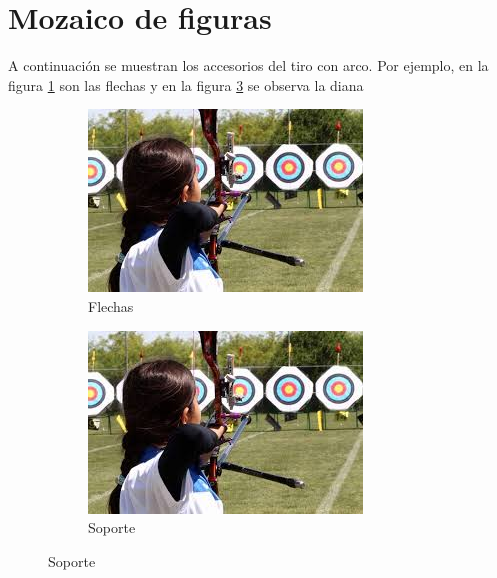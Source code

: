 \documentclass[12pt, legalpaper, twocolumn]{article}
\begin{document}
\section{Mozaico de figuras}

A continuación se muestran los accesorios del tiro con arco. Por ejemplo, en la figura \ref{a} son las flechas y en la figura \ref{b} se observa la diana

\begin{figure}[H] %
    \begin{subfigure}{0.45\textwidth}
        \centering
        \includegraphics[scale=1]{tiro_arco.jpg} 
        \caption{Flechas}
        \label{a}
    \end{subfigure}
    \begin{subfigure}{0.45\textwidth}
        \centering
        \includegraphics[scale=1]{tiro_arco.jpg} 
        \caption{Soporte}
        \label{b}
    \end{subfigure} 
    

\end{figure}
\end{document}
